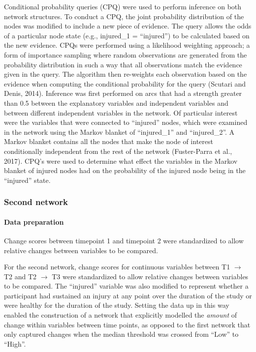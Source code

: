 \documentclass[
  english,
  man,floatsintext]{apa6}
\let\oldparagraph\paragraph
\renewcommand{\paragraph}[1]{\oldparagraph{#1}\mbox{}}
\begin{document}
Conditional probability queries (CPQ) were used to perform inference on both network structures. To conduct a CPQ, the joint probability distribution of the nodes was modified to include a new piece of evidence. The query allows the odds of a particular node state (e.g., injured\_1 = ``injured'') to be calculated based on the new evidence. CPQs were performed using a likelihood weighting approach; a form of importance sampling where random observations are generated from the probability distribution in such a way that all observations match the evidence given in the query. The algorithm then re-weights each observation based on the evidence when computing the conditional probability for the query (Scutari and Denis, 2014). Inference was first performed on arcs that had a strength greater than 0.5 between the explanatory variables and independent variables and between different independent variables in the network. Of particular interest were the variables that were connected to ``injured'' nodes, which were examined in the network using the Markov blanket of ``injured\_1'' and ``injured\_2''. A Markov blanket contains all the nodes that make the node of interest conditionally independent from the rest of the network (Fuster-Parra et al., 2017). CPQ's were used to determine what effect the variables in the Markov blanket of injured nodes had on the probability of the injured node being in the ``injured'' state.

\hypertarget{second-network}{%
\subsubsection{Second network}\label{second-network}}

\hypertarget{data-preparation-1}{%
\paragraph{Data preparation}\label{data-preparation-1}}

Change scores between timepoint 1 and timepoint 2 were standardized to allow relative changes between variables to be compared.

For the second network, change scores for continuous variables between T1 \(\rightarrow\) T2 and T2 \(\rightarrow\) T3 were standardized to allow relative changes between variables to be compared.
The ``injured'' variable was also modified to represent whether a participant had sustained an injury at any point over the duration of the study or were healthy for the duration of the study.
Setting the data up in this way enabled the construction of a network that explicitly modelled the \emph{amount} of change within variables between time points, as opposed to the first network that only captured changes when the median threshold was crossed from ``Low'' to ``High''.
\end{document}
